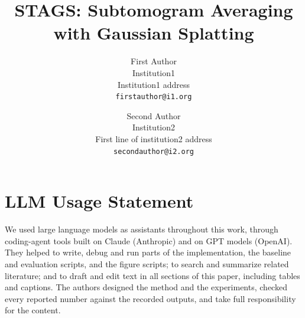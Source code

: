 \documentclass[10pt,twocolumn,letterpaper]{article}
\title{STAGS: Subtomogram Averaging with Gaussian Splatting}
\author{First Author\\
Institution1\\
Institution1 address\\
{\tt\small firstauthor@i1.org}
\and
Second Author\\
Institution2\\
First line of institution2 address\\
{\tt\small secondauthor@i2.org}
}
\begin{document}
\maketitle







% 



\section*{LLM Usage Statement}
We used large language models as assistants throughout this work, through coding-agent tools built on Claude (Anthropic) and on GPT models (OpenAI). They helped to write, debug and run parts of the implementation, the baseline and evaluation scripts, and the figure scripts; to search and summarize related literature; and to draft and edit text in all sections of this paper, including tables and captions. The authors designed the method and the experiments, checked every reported number against the recorded outputs, and take full responsibility for the content.


{
    \small
    
    
}




\end{document}
